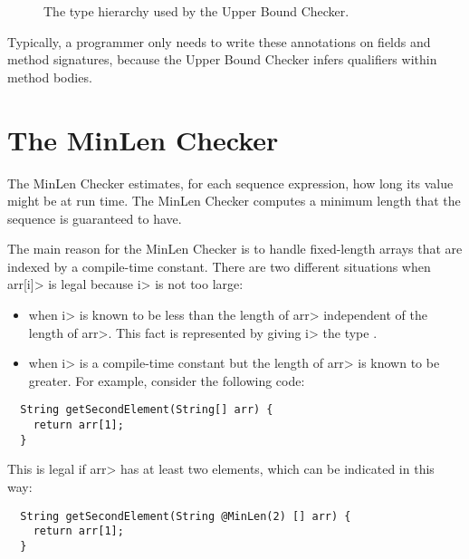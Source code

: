 \begin{figure}
  \caption{The type hierarchy used by the Upper Bound Checker.}
  \label{fig-upperbound-types}
\end{figure}


Typically, a programmer only needs to write these annotations on
fields and method signatures, because the Upper Bound Checker infers
qualifiers within method bodies.

\section{The MinLen Checker\label{index-minlen}}

The MinLen Checker estimates, for each sequence expression, how long its value
might be at run time.  The MinLen Checker computes a minimum length that
the sequence is guaranteed to have.

The main reason for the MinLen Checker is to handle fixed-length arrays
that are indexed by a compile-time constant.
There are two different situations when \<arr[i]> is legal because \<i> is
not too large:
\begin{itemize}
\item
  when \<i> is known to be less than the length of \<arr> independent of the length of
  \<arr>.  This fact is represented by giving \<i> the type .
\item
  when \<i> is a compile-time constant but the length of \<arr> is known to
  be greater.  For example, consider the following code:
\end{itemize}

\begin{Verbatim}
  String getSecondElement(String[] arr) {
    return arr[1];
  }
\end{Verbatim}
  This is legal if \<arr> has at least two elements, which can be indicated
  in this way:
\begin{Verbatim}
  String getSecondElement(String @MinLen(2) [] arr) {
    return arr[1];
  }
\end{Verbatim}

